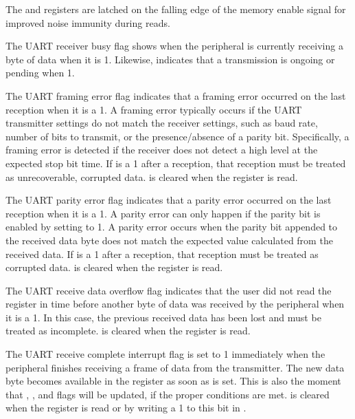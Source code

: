 The  and  registers are latched on the falling edge of the memory enable signal for improved noise immunity during reads.

The UART receiver busy flag  shows when the  peripheral is currently receiving a byte of data when it is 1. Likewise,  indicates that a transmission is ongoing or pending when 1.

The UART framing error flag  indicates that a framing error occurred on the last reception when it is a 1. A framing error typically occurs if the UART transmitter settings do not match the receiver settings, such as baud rate, number of bits to transmit, or the presence/absence of a parity bit. Specifically, a framing error is detected if the receiver does not detect a high level at the expected stop bit time. If  is a 1 after a reception, that reception must be treated as unrecoverable, corrupted data.  is cleared when the  register is read.

The UART parity error flag  indicates that a parity error occurred on the last reception when it is a 1. A parity error can only happen if the parity bit is enabled by setting  to 1. A parity error occurs when the parity bit appended to the received data byte does not match the expected value calculated from the received data. If  is a 1 after a reception, that reception must be treated as corrupted data.  is cleared when the  register is read.

The UART receive data overflow flag  indicates that the user did not read the  register in time before another byte of data was received by the  peripheral when it is a 1. In this case, the previous received data has been lost and must be treated as incomplete.  is cleared when the  register is read.

The UART receive complete interrupt flag  is set to 1 immediately when the  peripheral finishes receiving a frame of data from the transmitter. The new data byte becomes available in the  register as soon as  is set. This is also the moment that , , and  flags will be updated, if the proper conditions are met.  is cleared when the  register is read or by writing a 1 to this bit in .

